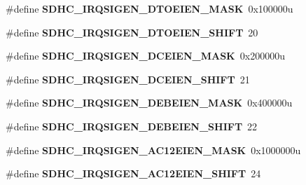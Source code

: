 \begin{DoxyCompactItemize}
\item 
\hypertarget{group___s_d_h_c___register___masks_ga16c82f46bb0de77ecd32731d597843e4}{}\#define {\bfseries S\+D\+H\+C\+\_\+\+I\+R\+Q\+S\+I\+G\+E\+N\+\_\+\+D\+T\+O\+E\+I\+E\+N\+\_\+\+M\+A\+S\+K}~0x100000u\label{group___s_d_h_c___register___masks_ga16c82f46bb0de77ecd32731d597843e4}

\item 
\hypertarget{group___s_d_h_c___register___masks_ga0d5615f1a4d2d1e8f8897fefbf7c1366}{}\#define {\bfseries S\+D\+H\+C\+\_\+\+I\+R\+Q\+S\+I\+G\+E\+N\+\_\+\+D\+T\+O\+E\+I\+E\+N\+\_\+\+S\+H\+I\+F\+T}~20\label{group___s_d_h_c___register___masks_ga0d5615f1a4d2d1e8f8897fefbf7c1366}

\item 
\hypertarget{group___s_d_h_c___register___masks_ga9993e87c1ebc32e1bf8b58af1460f470}{}\#define {\bfseries S\+D\+H\+C\+\_\+\+I\+R\+Q\+S\+I\+G\+E\+N\+\_\+\+D\+C\+E\+I\+E\+N\+\_\+\+M\+A\+S\+K}~0x200000u\label{group___s_d_h_c___register___masks_ga9993e87c1ebc32e1bf8b58af1460f470}

\item 
\hypertarget{group___s_d_h_c___register___masks_gae8c36f54cd9d4e06778ddea141252fb5}{}\#define {\bfseries S\+D\+H\+C\+\_\+\+I\+R\+Q\+S\+I\+G\+E\+N\+\_\+\+D\+C\+E\+I\+E\+N\+\_\+\+S\+H\+I\+F\+T}~21\label{group___s_d_h_c___register___masks_gae8c36f54cd9d4e06778ddea141252fb5}

\item 
\hypertarget{group___s_d_h_c___register___masks_gac596000fbd2ef20a87022ab4abbeb74a}{}\#define {\bfseries S\+D\+H\+C\+\_\+\+I\+R\+Q\+S\+I\+G\+E\+N\+\_\+\+D\+E\+B\+E\+I\+E\+N\+\_\+\+M\+A\+S\+K}~0x400000u\label{group___s_d_h_c___register___masks_gac596000fbd2ef20a87022ab4abbeb74a}

\item 
\hypertarget{group___s_d_h_c___register___masks_gac5c0c4b875fe244d9746cb09df94e6aa}{}\#define {\bfseries S\+D\+H\+C\+\_\+\+I\+R\+Q\+S\+I\+G\+E\+N\+\_\+\+D\+E\+B\+E\+I\+E\+N\+\_\+\+S\+H\+I\+F\+T}~22\label{group___s_d_h_c___register___masks_gac5c0c4b875fe244d9746cb09df94e6aa}

\item 
\hypertarget{group___s_d_h_c___register___masks_gacd242a1e4fdf5a31371c37720b6c5067}{}\#define {\bfseries S\+D\+H\+C\+\_\+\+I\+R\+Q\+S\+I\+G\+E\+N\+\_\+\+A\+C12\+E\+I\+E\+N\+\_\+\+M\+A\+S\+K}~0x1000000u\label{group___s_d_h_c___register___masks_gacd242a1e4fdf5a31371c37720b6c5067}

\item 
\hypertarget{group___s_d_h_c___register___masks_gad4b0bff90f4a58266dbbcc018d9b4b56}{}\#define {\bfseries S\+D\+H\+C\+\_\+\+I\+R\+Q\+S\+I\+G\+E\+N\+\_\+\+A\+C12\+E\+I\+E\+N\+\_\+\+S\+H\+I\+F\+T}~24\label{group___s_d_h_c___register___masks_gad4b0bff90f4a58266dbbcc018d9b4b56}


\end{DoxyCompactItemize}
